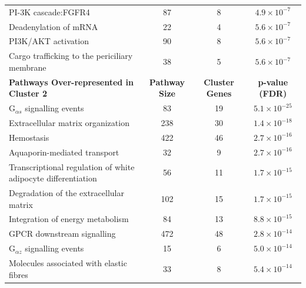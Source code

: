 \begin{table}[!hp]
{\begin{threeparttable}
\begin{tabular}{lccc}
  \rowcolor{Cluster_Blue!20} 
  PI-3K cascade:FGFR4 &  87 &   8 & $4.9 \times 10^{-7}$ \\ 
  \rowcolor{Cluster_Blue!15} 
  Deadenylation of \acrshort{mRNA} &  22 &   4 & $5.6 \times 10^{-7}$ \\ 
  \rowcolor{Cluster_Blue!20} 
  PI3K/AKT activation &  90 &   8 & $5.6 \times 10^{-7}$ \\ 
  \rowcolor{Cluster_Blue!15} 
  Cargo trafficking to the periciliary membrane &  38 &   5 & $5.6 \times 10^{-7}$ \\ 
  \hline
  \cellcolor{white} \large{\textbf{Pathways Over-represented in Cluster 2}} & \large{\textbf{Pathway Size}} & \large{\textbf{Cluster Genes}} & \large{\textbf{p-value (\gls{FDR})}} \\ %
  \hline
  \rowcolor{Cluster_Green!20}
  G$_{\alpha s}$ signalling events &  83 &  19 & $5.1 \times 10^{-25}$ \\ 
  \rowcolor{Cluster_Green!15}
  Extracellular matrix organization & 238 &  30 & $1.4 \times 10^{-18}$ \\ 
  \rowcolor{Cluster_Green!20} 
  Hemostasis & 422 &  46 & $2.7 \times 10^{-16}$ \\ 
  \rowcolor{Cluster_Green!15} 
  Aquaporin-mediated transport &  32 &   9 & $2.7 \times 10^{-16}$ \\ 
  \rowcolor{Cluster_Green!20} 
  Transcriptional regulation of white adipocyte differentiation &  56 &  11 & $1.7 \times 10^{-15}$ \\ 
  \rowcolor{Cluster_Green!15} 
  Degradation of the extracellular matrix & 102 &  15 & $1.7 \times 10^{-15}$ \\ 
  \rowcolor{Cluster_Green!20} 
  Integration of energy metabolism &  84 &  13 & $8.8 \times 10^{-15}$ \\ 
  \rowcolor{Cluster_Green!15} 
  GPCR downstream signalling & 472 &  48 & $2.8 \times 10^{-14}$ \\ 
  \rowcolor{Cluster_Green!20} 
  G$_{\alpha z}$ signalling events &  15 &   6 & $5.0 \times 10^{-14}$ \\ 
  \rowcolor{Cluster_Green!15} 
  Molecules associated with elastic fibres &  33 &   8 & $5.4 \times 10^{-14}$ \\ 

\end{tabular}
\end{threeparttable}}
\end{table}
